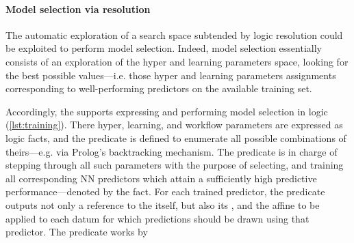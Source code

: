 \documentclass{article}
\begin{document}
\paragraph{Model selection via resolution}
\label{par:model-selection}

The automatic exploration of a search space subtended by logic resolution could be exploited to perform model selection.
%
Indeed, model selection essentially consists of an exploration of the hyper and learning parameters space, looking for the best possible values---i.e. those hyper and learning parameters assignments corresponding to well-performing predictors on the available training set.

Accordingly, the \mllib{} supports expressing and performing model selection in logic (\cref{lst:training}).
%
{}
\bigskip
%
There hyper, learning, and workflow parameters are expressed as logic facts, and the  predicate is defined to enumerate all possible combinations of theirs---e.g. via Prolog's backtracking mechanism.
%
The  predicate is in charge of stepping through all such parameters with the purpose of selecting, and training all corresponding NN predictors which attain a sufficiently high predictive performance---denoted by the  fact.
%
For each trained predictor, the predicate outputs not only a reference to the  itself, but also its , and the affine  to be applied to each datum for which predictions should be drawn using that predictor.
%
The predicate  works by
%
\end{document}
